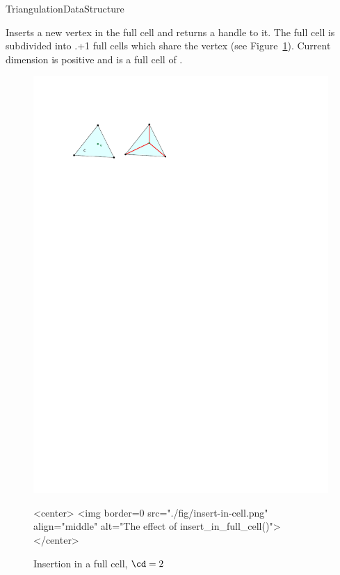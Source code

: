 \begin{ccRefConcept}{TriangulationDataStructure}

{Inserts a new
vertex  in the full cell  and returns a handle to
it. The full cell
 is subdivided into \ccVar.+1 full cells which
share the vertex  (see Figure~\ref{triangulation:fig:insert-full-cell}).
\ccPrecond Current dimension is positive and  is a full cell of
\ccVar.}

\begin{figure}[ht]
\begin{ccTexOnly}
\begin{center}
\includegraphics{Triangulation_ref/fig/insert-in-cell.pdf}
\end{center}
\end{ccTexOnly}
\begin{ccHtmlOnly}
<center>
<img border=0 src="./fig/insert-in-cell.png" align="middle" alt="The effect of insert_in_full_cell()">
</center>
\end{ccHtmlOnly}
\caption{Insertion in a full cell, $\cd=2$\label{triangulation:fig:insert-full-cell}}
\end{figure}


\end{ccRefConcept}
